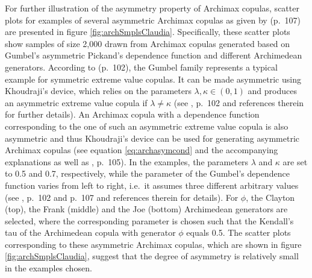 \documentclass[
]{krantz}
\begin{document}
For further illustration of the asymmetry property of Archimax copulas, scatter plots for examples of several asymmetric Archimax copulas as given by \citet{genest2013} (p.~107) are presented in figure \ref{fig:archSmplsClaudia}. Specifically, these scatter plots show samples of size 2,000 drawn from Archimax copulas generated based on Gumbel's asymmetric Pickand's dependence function and different Archimedean generators. According to \citet{genest2013} (p.~102), the Gumbel family represents a typical example for symmetric extreme value copulas. It can be made asymmetric using Khoudraji's device, which relies on the parameters \(\lambda, \kappa \in (0,1)\) and produces an asymmetric extreme value copula if \(\lambda \neq \kappa\) (see \citet{genest2013}, p.~102 and references therein for further details). An Archimax copula with a dependence function corresponding to the one of such an asymmetric extreme value copula is also asymmetric and thus Khoudraji's device can be used for generating asymmetric Archimax copulas (see equation \eqref{eq:archasymcond} and the accompanying explanations as well as \citet{genest2013}, p.~105). In the examples, the parameters \(\lambda\) and \(\kappa\) are set to 0.5 and 0.7, respectively, while the parameter of the Gumbel's dependence function varies from left to right, i.e.~it assumes three different arbitrary values (see \citet{genest2013}, p.~102 and p.~107 and references therein for details). For \(\phi\), the Clayton (top), the Frank (middle) and the Joe (bottom) Archimedean generators are selected, where the corresponding parameter is chosen such that the Kendall's tau of the Archimedean copula with generator \(\phi\) equals 0.5. The scatter plots corresponding to these asymmetric Archimax copulas, which are shown in figure \ref{fig:archSmplsClaudia}, suggest that the degree of asymmetry is relatively small in the examples chosen.
\end{document}
